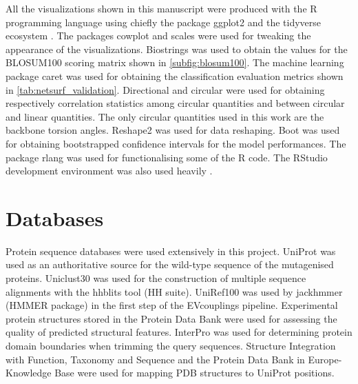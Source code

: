All the visualizations shown in this manuscript were produced with the R programming language \parencite[version 4.0.5]{RCT2021} using chiefly the package ggplot2 \parencite[version 3.3.3]{Wickham2016} and the tidyverse ecosystem \parencite[version 1.3.1]{Wickham2019}.
The packages cowplot \parencite[version 1.1.1]{Wilke2020} and scales \parencite[version 1.1.1]{Wickham2020} were used for tweaking the appearance of the visualizations.
Biostrings \parencite[version 2.56.0]{Pages2020} was used to obtain the values for the BLOSUM100 scoring matrix \parencite{Henikoff1992} shown in \cref{subfig:blosum100}.
The machine learning package caret \parencite[version 6.0--88]{Kuhn2021} was used for obtaining the classification evaluation metrics shown in \cref{tab:netsurf_validation}.
Directional \parencite[version 4.9]{Tsagris2021} and circular \parencite[version 0.4--93]{Agostinelli2017} were used for obtaining respectively correlation statistics among circular quantities and between circular and linear quantities.
The only circular quantities used in this work are the backbone torsion angles.
Reshape2 \parencite[version 1.4.4]{Wickham2007} was used for data reshaping.
Boot \parencite[version 1.3--28]{Canty2021} was used for obtaining bootstrapped confidence intervals for the model performances.
The package rlang \parencite[version 0.4.11]{Henry2021} was used for functionalising some of the R code.
The RStudio development environment was also used heavily \parencite[version 1.4.1103 ``Wax Begonia'']{RStudioTeam2021}.

\section{Databases}
Protein sequence databases were used extensively in this project.
UniProt \parencite[release \texttt{2021\_02}]{Bateman2020} was used as an authoritative source for the wild-type sequence of the mutagenised proteins.
Uniclust30 \parencite[release \texttt{2020\_06}]{Mirdita2016} was used for the construction of multiple sequence alignments with the hhblits tool (HH suite).
UniRef100 \parencite[release \texttt{2021\_4}]{Suzek2014} was used by jackhmmer (HMMER package) in the first step of the EVcouplings pipeline.
Experimental protein structures stored in the Protein Data Bank \parencite[PDB,][accessed in March 2021]{Burley2018} were used for assessing the quality of predicted structural features.
InterPro \parencite[release 84.0]{Blum2020} was used for determining protein domain boundaries when trimming the query sequences.
Structure Integration with Function, Taxonomy and Sequence \parencite[SIFTS,][accessed in March 2021]{Dana2018} and the Protein Data Bank in Europe-Knowledge Base \parencite[PDBe-KB,][accessed in March 2021]{Varadi2019} were used for mapping PDB structures to UniProt positions.

